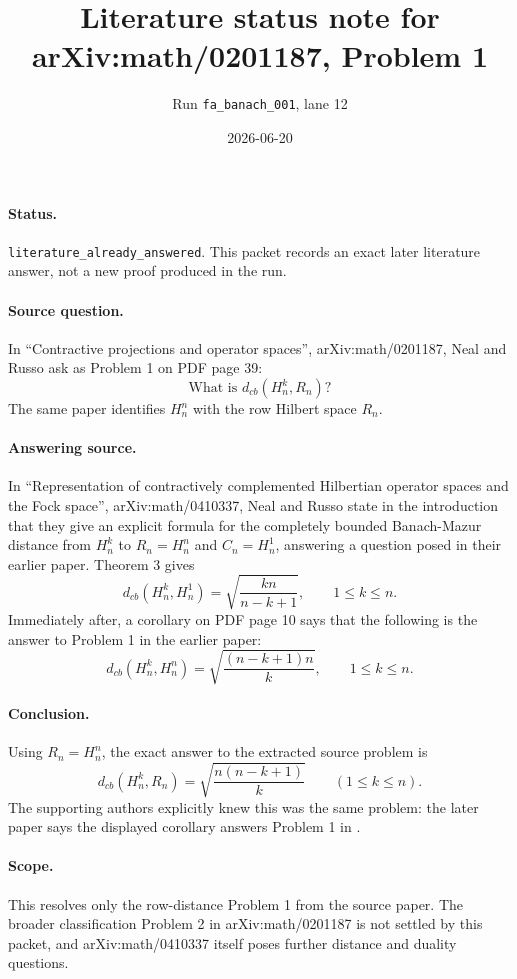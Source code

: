 \documentclass[11pt]{article}
\title{Literature status note for arXiv:math/0201187, Problem 1}
\author{Run \texttt{fa\_banach\_001}, lane 12}
\date{2026-06-20}
\begin{document}
\maketitle

\paragraph{Status.}
\texttt{literature\_already\_answered}.  This packet records an exact later
literature answer, not a new proof produced in the run.

\paragraph{Source question.}
In ``Contractive projections and operator spaces'', arXiv:math/0201187,
Neal and Russo ask as Problem 1 on PDF page 39:
\[
  \text{What is } d_{cb}(H_n^k,R_n)?
\]
The same paper identifies \(H_n^n\) with the row Hilbert space \(R_n\).

\paragraph{Answering source.}
In ``Representation of contractively complemented Hilbertian operator spaces
and the Fock space'', arXiv:math/0410337, Neal and Russo state in the
introduction that they give an explicit formula for the completely bounded
Banach-Mazur distance from \(H_n^k\) to \(R_n=H_n^n\) and \(C_n=H_n^1\),
answering a question posed in their earlier paper.
Theorem 3 gives
\[
  d_{cb}(H_n^k,H_n^1)=\sqrt{\frac{kn}{n-k+1}},
  \qquad 1\leq k\leq n.
\]
Immediately after, a corollary on PDF page 10 says that the following is the
answer to Problem 1 in the earlier paper:
\[
  d_{cb}(H_n^k,H_n^n)=\sqrt{\frac{(n-k+1)n}{k}},
  \qquad 1\leq k\leq n.
\]

\paragraph{Conclusion.}
Using \(R_n=H_n^n\), the exact answer to the extracted source problem is
\[
  \boxed{d_{cb}(H_n^k,R_n)=\sqrt{\frac{n(n-k+1)}{k}}}
  \qquad (1\leq k\leq n).
\]
The supporting authors explicitly knew this was the same problem: the later
paper says the displayed corollary answers Problem 1 in \cite{NR03}.

\paragraph{Scope.}
This resolves only the row-distance Problem 1 from the source paper.  The
broader classification Problem 2 in arXiv:math/0201187 is not settled by this
packet, and arXiv:math/0410337 itself poses further distance and duality
questions.
\end{document}
